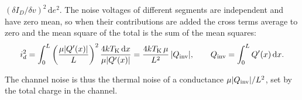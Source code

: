 \documentclass[11pt,a4paper]{article}
\newcommand{\dd}{\mathrm{d}}
\begin{document}
\begin{itemize}
  $(\delta I_D/\delta v)^2\,\dd e^2$. The noise voltages of different
  segments are independent and have zero mean, so when their contributions
  are added the cross terms average to zero and the mean square of the total
  is the sum of the mean squares:
%
\begin{equation}
 i_d^2=\int_0^L\left(\frac{\mu|Q'(x)|}{L}\right)^2
 \frac{4kT_{\rm K}\,\dd x}{\mu|Q'(x)|}
 =\frac{4kT_{\rm K}\,\mu}{L^2}\,|Q_{\rm inv}| ,
 \qquad Q_{\rm inv}=\int_0^L Q'(x)\,\dd x .
\label{eq:idsq}
\end{equation}
%
\end{itemize}
%
The channel noise is thus the thermal noise of a conductance
$\mu|Q_{\rm inv}|/L^2$, set by the total charge in the channel.
\end{document}
